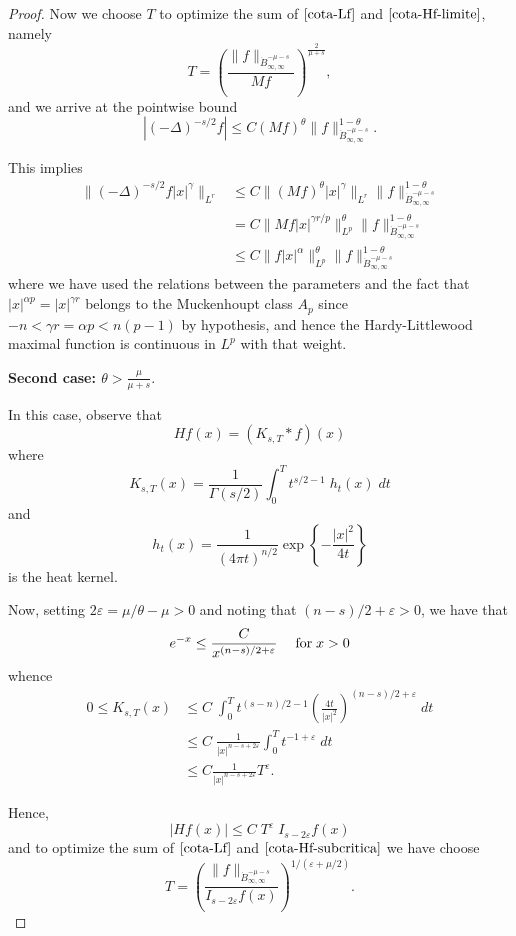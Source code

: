 \documentclass[12pt]{amsart}
\newcommand {\be}{\begin{equation}}
\newcommand {\ee}{\end{equation}}
\begin{document}
\begin{proof}
 Now we choose $T$ to optimize the sum of $\eqref{cota-Lf}$ and $\eqref{cota-Hf-limite}$, namely
 $$
 T=\left( \frac{\|f\|_{\dot{B}^{-\mu-s}_{\infty,\infty}}}{Mf} \right)^\frac{2}{\mu+s},
 $$
and we arrive at the pointwise bound 
$$
|(-\Delta)^{-s/2}f| \le C (Mf)^\theta \|f\|_{\dot{B}^{-\mu-s}_{\infty,\infty}}^{1-\theta}.
$$

This implies 
\begin{align*}
\|(-\Delta)^{-s/2}f |x|^\gamma\|_{L^r} & \le C \|(Mf)^\theta |x|^\gamma\|_{L^r} \|f\|_{\dot{B}^{-\mu-s}_{\infty,\infty}}^{1-\theta}\\
& = C \|Mf  |x|^{\gamma r/p}\|_{L^p}^\theta \|f\|_{\dot{B}^{-\mu-s}_{\infty,\infty}}^{1-\theta}\\
& \le C \|f  |x|^\alpha\|_{L^p}^\theta \|f\|_{\dot{B}^{-\mu-s}_{\infty,\infty}}^{1-\theta}
\end{align*}
where we have used the relations between the parameters and the fact that $|x|^{\alpha p}=|x|^{\gamma r }$ belongs to the Muckenhoupt class $A_p$ since $-n<\gamma r = \alpha p<n(p-1)$ by hypothesis, and hence the Hardy-Littlewood maximal function is continuous in $L^p$ with that weight.

\medskip

{\bf Second case: $\theta>\frac{\mu}{\mu+s}.$}

In this case,  observe that
$$ Hf(x)= (K_{s,T} * f)(x) $$
where
$$ K_{s,T}(x)= \frac{1}{\Gamma(s/2)} \int_0^T t^{s/2-1} \; h_t(x) \; dt $$
and
$$ h_t(x)= \frac{1}{(4\pi t)^{n/2}} \exp \left\{-\frac{|x|^2}{4t} \right\} $$
is the heat kernel. 

Now, setting $2\varepsilon =\mu/\theta -\mu >0$ and  noting that $(n-s)/2+\varepsilon>0$, we have that 
$$
	 e^{-x} \leq \frac{C}{x^{(n-s)/2+\varepsilon}} \quad \; \hbox{for} \; 
	x >0
 $$
whence
\begin{align*}
0 \leq K_{s,T}(x) & \leq C \; \int_0^T t^{(s-n)/2-1} 
 \left(\frac{4t}{|x|^2} \right)^{(n-s)/2+\varepsilon} \; dt \\
& \leq C \; \frac{1}{|x|^{n-s+2\varepsilon}} \int_0^T
t^{-1+\varepsilon} \; dt  \\
&\leq C \frac{1}{|x|^{n-s+2\varepsilon}}
T^\varepsilon .
\end{align*}

Hence, 
\be 
\label{cota-Hf-subcritica}
|Hf(x)| \leq C \;  T^\varepsilon \; I_{s-2\varepsilon}f(x) \ee
and to optimize the sum of $\eqref{cota-Lf}$ and $\eqref{cota-Hf-subcritica}$ we have choose 
$$ T= \left( \frac{ \| f
\|_{\dot{B}^{-\mu-s}_{\infty,\infty}}}{I_{s-2\varepsilon}f(x)}
\right)^{1/(\varepsilon+\mu/2)} .$$


\end{proof}
\end{document}
